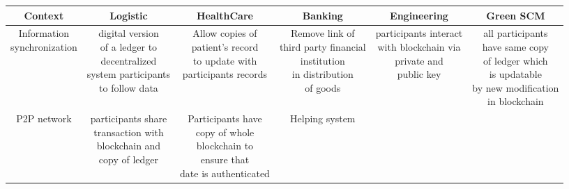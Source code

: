  \begin{table}[h!]
 \begin{center}
   \begin{adjustwidth}{-1cm}{}
	
 	\begin{tabular} { c | c | c | c | c | c }
 			
 		\tiny \textbf{Context} &\tiny \textbf{Logistic}\cite{Tijan} & \tiny \textbf{HealthCare} & \tiny \textbf{Banking}\cite{Guo} & \tiny \textbf{Engineering}\cite{Kontantinos} & \tiny \textbf{Green SCM}\cite{Sarkis} \\
 		\hline
 		\tiny \makecell{Information\\ synchronization} & \tiny \makecell{digital version\\ of a ledger to\\ decentralized\\ system participants\\ to follow data} & \tiny \makecell {Allow copies of\\ patient's record\\ to update with \\participants records} & \tiny \makecell{Remove link of \\third party financial\\ institution\\ in distribution\\ of goods} & \tiny \makecell{participants interact\\ with blockchain via\\ private and\\ public key} & \tiny \makecell{all participants\\ have same copy\\ of ledger which\\ is updatable\\ by new modification \\in blockchain}\\ 
 		\hline 
 		\tiny P2P network   & \tiny \makecell{participants share \\transaction with\\ blockchain and\\ copy of ledger}& \tiny \makecell{Participants have \\copy of whole\\ blockchain to\\ ensure that \\date is authenticated} & \tiny \makecell{Helping system\\
}
\end{tabular}
\end{adjustwidth}
\end{center}
\end{table}
